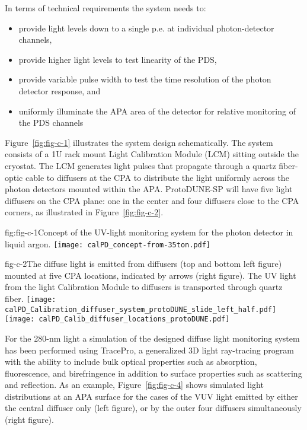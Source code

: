In terms of technical requirements the system needs to:
\begin{itemize}
\item provide light levels down to a single p.e. at individual photon-detector channels,
\item provide higher light levels to test linearity of the PDS,
\item provide variable pulse width to test the time resolution of the photon detector response, and
\item uniformly illuminate the APA area of the detector for relative monitoring of the PDS channels
\end{itemize}


Figure~\ref{fig:fig-c-1} illustrates the system design schematically. The system consists of a 1U rack mount Light Calibration Module (LCM) sitting outside the cryostat. The LCM generates light pulses that propagate through a quartz fiber-optic cable to diffusers at the CPA to distribute the light uniformly across the photon detectors mounted within the APA.  ProtoDUNE-SP will have five light 
diffusers on the CPA plane: one in the center and four diffusers close to the CPA corners, as illustrated in Figure~\ref{fig:fig-c-2}. 
%
 \begin{cdrfigure}{fig:fig-c-1}{Concept of the UV-light monitoring system for the photon detector in liquid argon.}
\texttt{[image: calPD\_concept-from-35ton.pdf]}
\end{cdrfigure}
%
%
\begin{cdrfigure}{fig-c-2}{The diffuse light is emitted from diffusers (top and bottom left figure) mounted at five CPA locations, indicated by arrows (right figure). 
The UV light from the light Calibration Module to diffusers is transported through quartz fiber.}
\texttt{[image: calPD\_Calibration\_diffuser\_system\_protoDUNE\_slide\_left\_half.pdf]}
\texttt{[image: calPD\_Calib\_diffuser\_locations\_protoDUNE.pdf]}
\end{cdrfigure}

%
%
For the 280-nm light a simulation of the designed diffuse light monitoring system has been performed using TracePro, a generalized 3D light ray-tracing program with the ability 
to include bulk optical properties such as absorption, fluorescence, and birefringence in addition to surface properties such as scattering and reflection. 
As an example, Figure~\ref{fig:fig-c-4} shows simulated light distributions at an APA surface for the cases of the VUV light emitted by either the central diffuser only (left figure), 
or by the outer four diffusers simultaneously (right figure). 

